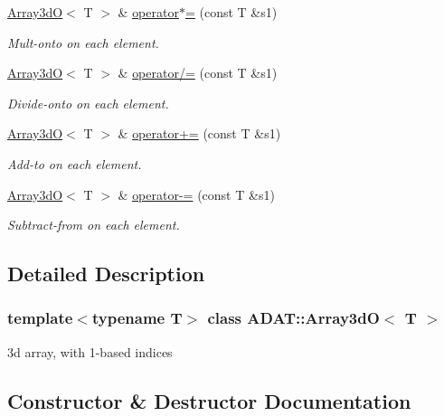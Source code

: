 \begin{DoxyCompactItemize}
\mbox{\hyperlink{classADAT_1_1Array3dO}{Array3dO}}$<$ T $>$ \& \mbox{\hyperlink{classADAT_1_1Array3dO_acec17a674874030d454e516aad24f8a8}{operator$\ast$=}} (const T \&s1)
\begin{DoxyCompactList}\small\item\em Mult-\/onto on each element. \end{DoxyCompactList}\item 
\mbox{\hyperlink{classADAT_1_1Array3dO}{Array3dO}}$<$ T $>$ \& \mbox{\hyperlink{classADAT_1_1Array3dO_a9d82ba391c67603f43b112c945532de6}{operator/=}} (const T \&s1)
\begin{DoxyCompactList}\small\item\em Divide-\/onto on each element. \end{DoxyCompactList}\item 
\mbox{\hyperlink{classADAT_1_1Array3dO}{Array3dO}}$<$ T $>$ \& \mbox{\hyperlink{classADAT_1_1Array3dO_a6e5f624a1a14555b030d5fb53cb85f9c}{operator+=}} (const T \&s1)
\begin{DoxyCompactList}\small\item\em Add-\/to on each element. \end{DoxyCompactList}\item 
\mbox{\hyperlink{classADAT_1_1Array3dO}{Array3dO}}$<$ T $>$ \& \mbox{\hyperlink{classADAT_1_1Array3dO_a0341b7ddc224910074b55646bca45e2a}{operator-\/=}} (const T \&s1)
\begin{DoxyCompactList}\small\item\em Subtract-\/from on each element. \end{DoxyCompactList}\end{DoxyCompactItemize}


\subsection{Detailed Description}
\subsubsection*{template$<$typename T$>$\newline
class A\+D\+A\+T\+::\+Array3d\+O$<$ T $>$}

3d array, with 1-\/based indices 

\subsection{Constructor \& Destructor Documentation}
\mbox{\label{classADAT_1_1Array3dO_aaf7d69b08f7c9e5c01a123da7f52b8d1}} 
